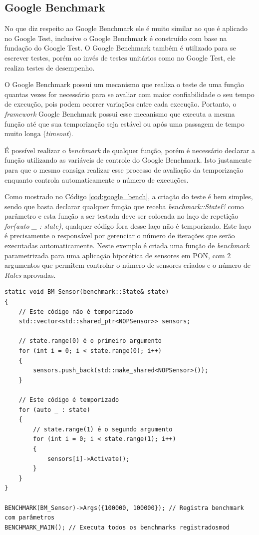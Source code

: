 \subsection{Google Benchmark}

No que diz respeito ao Google Benchmark ele é muito similar ao que é aplicado no
Google Test, inclusive o Google Benchmark é construído com base na fundação do
Google Test. O Google Benchmark também é utilizado para se escrever testes,
porém ao invés de testes unitários como no Google Test, ele realiza testes de
desempenho.

O Google Benchmark possui um mecanismo que realiza o teste de uma função quantas
vezes for necessário para se avaliar com maior confiabilidade o seu tempo de
execução, pois podem ocorrer variações entre cada execução. Portanto, o
\textit{framework} Google Benchmark possui esse mecanismo que executa a mesma
função até que sua temporização seja estável ou após uma passagem de tempo muito
longa (\textit{timeout}).

É possível realizar o \textit{benchmark} de qualquer função, porém é necessário
declarar a função utilizando as variáveis de controle do Google Benchmark. Isto
justamente para que o mesmo consiga realizar esse processo de avaliação da
temporização enquanto controla automaticamente o número de execuções.

Como mostrado no Código \ref{cod:google_bench}, a criação do teste é bem
simples, sendo que basta declarar qualquer função que receba
\textit{benchmark::State\&} como parâmetro e esta função a ser testada deve ser
colocada no laço de repetição \textit{for(auto \_ : state)}, qualquer código
fora desse laço não é temporizado. Este laço é precisamente o responsável por
gerenciar o número de iterações que serão executadas automaticamente. Neste
exemplo é criada uma função de \textit{benchmark} parametrizada para uma
aplicação hipotética de sensores em PON, com 2 argumentos que permitem controlar
o número de sensores criados e o número de \textit{Rules} aprovadas.

\begin{lstlisting}[caption = {Caso de teste com Google Benchmark}, float=htb,
source = {Adaptado de \citeonline{google_test_primer}}, label = {cod:google_bench}]
static void BM_Sensor(benchmark::State& state)
{
    // Este código não é temporizado
    std::vector<std::shared_ptr<NOPSensor>> sensors;

    // state.range(0) é o primeiro argumento
    for (int i = 0; i < state.range(0); i++)
    {
        sensors.push_back(std::make_shared<NOPSensor>());
    }

    // Este código é temporizado
    for (auto _ : state)
    {
        // state.range(1) é o segundo argumento
        for (int i = 0; i < state.range(1); i++)
        {
            sensors[i]->Activate();
        }
    }
}

BENCHMARK(BM_Sensor)->Args({100000, 100000}); // Registra benchmark com parâmetros
BENCHMARK_MAIN(); // Executa todos os benchmarks registradosmod
\end{lstlisting}


